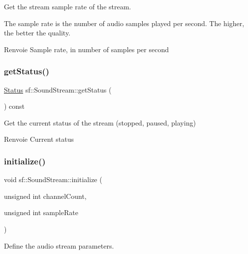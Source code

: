 Get the stream sample rate of the stream. 

The sample rate is the number of audio samples played per second. The higher, the better the quality.

\begin{DoxyReturn}{Renvoie}
Sample rate, in number of samples per second 
\end{DoxyReturn}
\mbox{\label{classsf_1_1SoundStream_a64a8193ed728da37c115c65de015849f}} 
\subsubsection{\texorpdfstring{get\+Status()}{getStatus()}}
{\footnotesize\ttfamily \hyperlink{classsf_1_1SoundSource_ac43af72c98c077500b239bc75b812f03}{Status} sf\+::\+Sound\+Stream\+::get\+Status (\begin{DoxyParamCaption}{ }\end{DoxyParamCaption}) const}



Get the current status of the stream (stopped, paused, playing) 

\begin{DoxyReturn}{Renvoie}
Current status 
\end{DoxyReturn}
\mbox{\label{classsf_1_1SoundStream_a9c351711198ee1aa77c2fefd3ced4d2c}} 
\subsubsection{\texorpdfstring{initialize()}{initialize()}}
{\footnotesize\ttfamily void sf\+::\+Sound\+Stream\+::initialize (\begin{DoxyParamCaption}\item[{unsigned int}]{channel\+Count,  }\item[{unsigned int}]{sample\+Rate }\end{DoxyParamCaption})\hspace{0.3cm}{\ttfamily [protected]}}



Define the audio stream parameters. 

